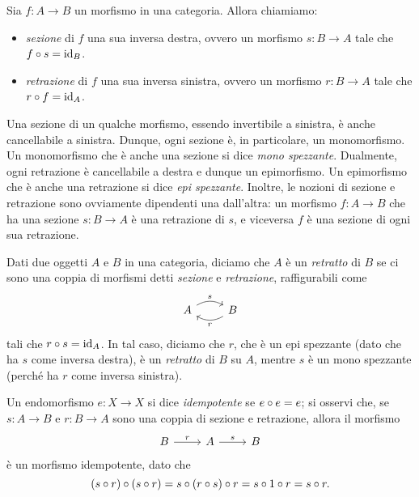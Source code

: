 \begin{definition}
	Sia \(f \colon A \to B\) un morfismo in una categoria.
	Allora chiamiamo:
	\begin{itemize}
		\item \emph{sezione} di \(f\) una sua inversa destra, ovvero un morfismo \(s \colon B \to A\) tale che \(f \circ s = \mathrm{id}_{B}\).
		\item \emph{retrazione} di \(f\) una sua inversa sinistra, ovvero un morfismo \(r \colon B \to A\) tale che \(r \circ f = \mathrm{id}_{A}\).
	\end{itemize}
\end{definition}
\begin{remark}
	Una sezione di un qualche morfismo, essendo invertibile a sinistra, è anche cancellabile a sinistra.
	Dunque, ogni sezione è, in particolare, un monomorfismo.
	Un monomorfismo che è anche una sezione si dice \emph{mono spezzante}.
	Dualmente, ogni retrazione è cancellabile a destra e dunque un epimorfismo.
	Un epimorfismo che è anche una retrazione si dice \emph{epi spezzante}.
	Inoltre, le nozioni di sezione e retrazione sono ovviamente dipendenti una dall'altra:
	un morfismo \(f : A \to B\) che ha una sezione \(s : B\to A\) è una retrazione di \(s\),
	e viceversa \(f\) è una sezione di ogni sua retrazione.
\end{remark}

\begin{definition}[Retratto]
	Dati due oggetti \(A\) e \(B\) in una categoria,
	diciamo che \(A\) è un \emph{retratto} di \(B\) se ci sono una coppia di morfismi detti \emph{sezione} e \emph{retrazione}, raffigurabili come
	\begin{equation}
		\begin{tikzcd}
			A \ar[r, bend left, "s"] &B \ar[l, bend left, "r"]
		\end{tikzcd}
	\end{equation}
	tali che \(r \circ s = \mathrm{id}_A\).
	In tal caso, diciamo che \(r\), che è un epi spezzante (dato che ha \(s\) come inversa destra), è un \emph{retratto} di \(B\) su \(A\), mentre \(s\) è un mono spezzante (perché ha \(r\) come inversa sinistra).
\end{definition}
\begin{remark}
	Un endomorfismo \(e : X\to X\) si dice \emph{idempotente} se \(e\circ e=e\); si osservi che, se \(s \colon A \to B\) e \(r \colon B \to A\) sono una coppia di sezione e retrazione,
	allora il morfismo
	\begin{equation}
		\begin{tikzcd}
			B \ar[r, "r"] & A \ar[r, "s"] &B
		\end{tikzcd}
	\end{equation}
	è un morfismo idempotente, dato che
	\[(s\circ r)\circ (s\circ r) = s\circ (r\circ s)\circ r = s\circ 1\circ r=s\circ r.\]
\end{remark}

